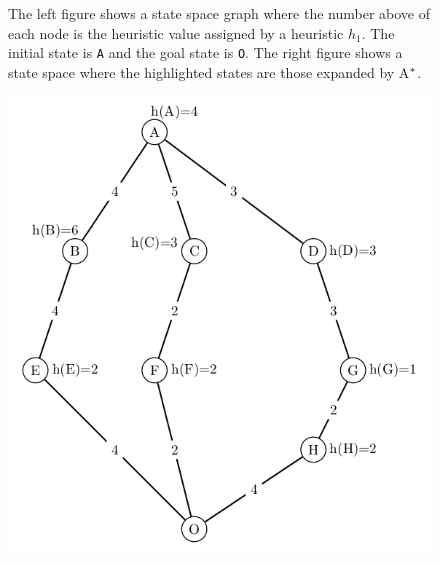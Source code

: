 \begin{figure}[!htb]
\endminipage
\caption{The left figure shows a state space graph where the number above of each node is the heuristic value assigned by a heuristic $h_{1}$. The initial state is \texttt{A} and the goal state is \texttt{O}. The right figure shows a state space where the highlighted states are those expanded by A$\sp{*}$. }\label{fig:image_h1_astar}
\end{figure}

\begin{figure}[!htb]
  \includegraphics[width=\linewidth]{images/marvinh2full-left}
\endminipage\hfill
{}

\end{figure}
